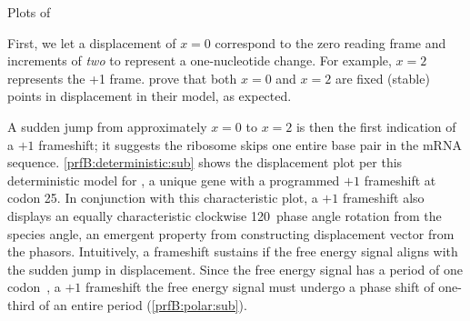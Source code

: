 \documentclass[12pt]{article}
\numberwithin{equation}{section}
\begin{document}
\begin{cfigure}
  \caption{Plots of~\prfB}
  \label{prfB:detplots}
\end{cfigure}

First, we let a displacement of $x = 0$ correspond to the zero reading
frame and increments of \emph{two} to represent a one-nucleotide
change. For example, $x =2$ represents the +1 frame.
\citet{lalit:embs} prove that both $x = 0$ and $x = 2$ are fixed
(stable) points in displacement in their model, as expected.

A sudden jump from approximately $x = 0$ to $x = 2$ is then the first
indication of a $+1$ frameshift; it suggests the ribosome skips one
entire base pair in the mRNA sequence.  \autoref{prfB:deterministic:sub}
shows the displacement plot per this deterministic model for \prfB, a
unique gene with a programmed $+1$ frameshift at codon 25. In
conjunction with this characteristic plot, a $+1$ frameshift also
displays an equally characteristic clockwise 120\degree\ phase angle
rotation from the species angle, an emergent property from
constructing displacement vector from the phasors.  Intuitively, a
frameshift sustains if the free energy signal aligns with the sudden
jump in displacement.  Since the free energy signal has a period of
one codon~\cite{lalit:mechanics}, a $+1$ frameshift the free energy
signal must undergo a phase shift of one-third of an entire period
(\autoref{prfB:polar:sub}).
\end{document}
